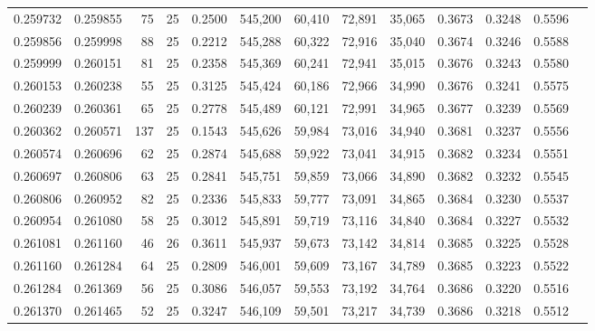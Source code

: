 \begin{tabular}{rrrrrrrrrrrrr}
0.259732 & 0.259855 &    75 &  25 &                                     0.2500 & 545,200 &  60,410 &  72,891 &  35,065 & 0.3673 & 0.3248 & 0.5596 \\
0.259856 & 0.259998 &    88 &  25 &                                     0.2212 & 545,288 &  60,322 &  72,916 &  35,040 & 0.3674 & 0.3246 & 0.5588 \\
0.259999 & 0.260151 &    81 &  25 &                                     0.2358 & 545,369 &  60,241 &  72,941 &  35,015 & 0.3676 & 0.3243 & 0.5580 \\
0.260153 & 0.260238 &    55 &  25 &                                     0.3125 & 545,424 &  60,186 &  72,966 &  34,990 & 0.3676 & 0.3241 & 0.5575 \\
0.260239 & 0.260361 &    65 &  25 &                                     0.2778 & 545,489 &  60,121 &  72,991 &  34,965 & 0.3677 & 0.3239 & 0.5569 \\
0.260362 & 0.260571 &   137 &  25 &                                     0.1543 & 545,626 &  59,984 &  73,016 &  34,940 & 0.3681 & 0.3237 & 0.5556 \\
0.260574 & 0.260696 &    62 &  25 &                                     0.2874 & 545,688 &  59,922 &  73,041 &  34,915 & 0.3682 & 0.3234 & 0.5551 \\
0.260697 & 0.260806 &    63 &  25 &                                     0.2841 & 545,751 &  59,859 &  73,066 &  34,890 & 0.3682 & 0.3232 & 0.5545 \\
0.260806 & 0.260952 &    82 &  25 &                                     0.2336 & 545,833 &  59,777 &  73,091 &  34,865 & 0.3684 & 0.3230 & 0.5537 \\
0.260954 & 0.261080 &    58 &  25 &                                     0.3012 & 545,891 &  59,719 &  73,116 &  34,840 & 0.3684 & 0.3227 & 0.5532 \\
0.261081 & 0.261160 &    46 &  26 &                                     0.3611 & 545,937 &  59,673 &  73,142 &  34,814 & 0.3685 & 0.3225 & 0.5528 \\
0.261160 & 0.261284 &    64 &  25 &                                     0.2809 & 546,001 &  59,609 &  73,167 &  34,789 & 0.3685 & 0.3223 & 0.5522 \\
0.261284 & 0.261369 &    56 &  25 &                                     0.3086 & 546,057 &  59,553 &  73,192 &  34,764 & 0.3686 & 0.3220 & 0.5516 \\
0.261370 & 0.261465 &    52 &  25 &                                     0.3247 & 546,109 &  59,501 &  73,217 &  34,739 & 0.3686 & 0.3218 & 0.5512 \\

\end{tabular}
